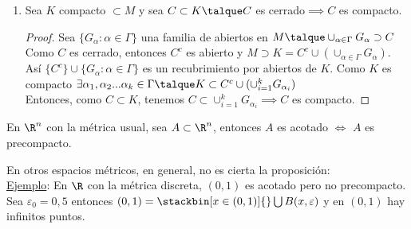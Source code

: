 \begin{proposicion}
\begin{enumerate}[1)]
	  		\item Sea $K$ compacto $\subset M$  y sea $C\subset K \talque C$ es cerrado$\implies C$ es compacto.
	  			\begin{proof}
	  			Sea $\{G_\alpha :\alpha \in \Gamma\}$ una familia de abiertos en $M \talque \\ \cup_{\alpha\in\Gamma} G_\alpha \supset C$ \\
	  			Como $C$ es cerrado, entonces $C^c$ es abierto y $M\supset K=C^c \cup (\cup_{\alpha\in\Gamma} G_\alpha)$. Así $\{C^c\}\cup\{G_\alpha :\alpha\in\Gamma\}$ es un recubrimiento por abiertos de $K$. Como $K$ es compacto $\exists \alpha_1,\alpha_2 ...\alpha_k \in\Gamma\talque K\subset C^c\cup(\cup^k_{i=1}G_{\alpha_i})$\\
	  			Entonces, como $C\subset K$, tenemos $C\subset\cup^k_{i=1}G_{\alpha_i} \implies C$ es compacto.
	  			\end{proof}
		\end{enumerate}
	\end{proposicion}
	
	\begin{proposicion} En $\R^n$ con la métrica usual, sea $A\subset \R^n$, entonces $A$ es acotado $\iff$ $A$ es precompacto.
	\begin{observacion} En otros espacios métricos, en general, no es cierta la proposición:\\
	\underline{Ejemplo}: En $\R$ con la métrica discreta, $(0,1)$ es acotado pero no precompacto. Sea $\varepsilon_0=0,5$ entonces $(0,1)=\stackbin[x\in(0,1)]{}\bigcup B(x,\varepsilon)$ y en $(0,1)$ hay infinitos puntos.
	\end{observacion}
	\end{proposicion}
	
